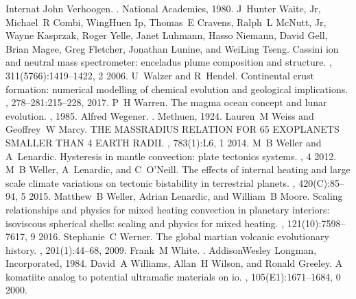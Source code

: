 \documentclass[letterpaper,10pt,english]{jupyterBook}
\begin{document}
\begin{sphinxthebibliography}{Internat}
\sphinxAtStartPar
John Verhoogen. . National Academies, 1980.
\sphinxAtStartPar
J Hunter Waite, Jr, Michael R Combi, Wing\sphinxhyphen{}Huen Ip, Thomas E Cravens, Ralph L McNutt, Jr, Wayne Kasprzak, Roger Yelle, Janet Luhmann, Hasso Niemann, David Gell, Brian Magee, Greg Fletcher, Jonathan Lunine, and Wei\sphinxhyphen{}Ling Tseng. Cassini ion and neutral mass spectrometer: enceladus plume composition and structure. , 311(5766):1419–1422, 2 2006.
\sphinxAtStartPar
U Walzer and R Hendel. Continental crust formation: numerical modelling of chemical evolution and geological implications. , 278–281:215–228, 2017.
\sphinxAtStartPar
P H Warren. The magma ocean concept and lunar evolution. , 1985.
\sphinxAtStartPar
Alfred Wegener. . Methuen, 1924.
\sphinxAtStartPar
Lauren M Weiss and Geoffrey W Marcy. THE MASS\sphinxhyphen{}RADIUS RELATION FOR 65 EXOPLANETS SMALLER THAN 4 EARTH RADII. , 783(1):L6, 1 2014.
\sphinxAtStartPar
M B Weller and A Lenardic. Hysteresis in mantle convection: plate tectonics systems. , 4 2012.
\sphinxAtStartPar
M B Weller, A Lenardic, and C O'Neill. The effects of internal heating and large scale climate variations on tectonic bi\sphinxhyphen{}stability in terrestrial planets. , 420(C):85–94, 5 2015.
\sphinxAtStartPar
Matthew B Weller, Adrian Lenardic, and William B Moore. Scaling relationships and physics for mixed heating convection in planetary interiors: isoviscous spherical shells: scaling and physics for mixed heating. , 121(10):7598–7617, 9 2016.
\sphinxAtStartPar
Stephanie C Werner. The global martian volcanic evolutionary history. , 201(1):44–68, 2009.
\sphinxAtStartPar
Frank M White. . Addison\sphinxhyphen{}Wesley Longman, Incorporated, 1984.
\sphinxAtStartPar
David A Williams, Allan H Wilson, and Ronald Greeley. A komatiite analog to potential ultramafic materials on io. , 105(E1):1671–1684, 0 2000.

\end{sphinxthebibliography}
\end{document}
